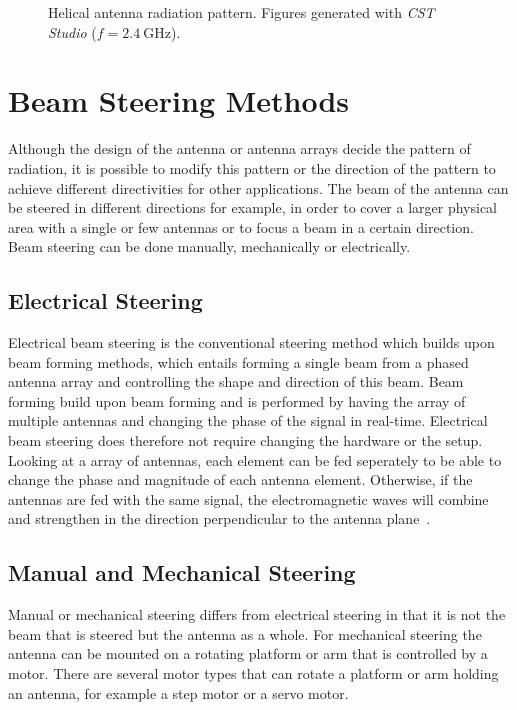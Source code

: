 \begin{figure}[H]
\begin{minipage}{0.45\textwidth}
    \end{minipage}
    \caption{Helical antenna radiation pattern. Figures generated with \textit{CST Studio} ($f=\SI{2.4}{\giga\hertz}$).}
    \label{fig:helical_1}
\end{figure}

\section{Beam Steering Methods}
Although the design of the antenna or antenna arrays decide the pattern of radiation, it is possible to modify this pattern or the direction of the pattern to achieve different directivities for other applications. The beam of the antenna can be steered in different directions for example, in order to cover a larger physical area with a single or few antennas or to focus a beam in a certain direction. Beam steering can be done manually, mechanically or electrically.

\subsection{Electrical Steering}
Electrical beam steering is the conventional steering method which builds upon beam forming methods, which entails forming a single beam from a phased antenna array and controlling the shape and direction of this beam. Beam forming build upon beam forming and is performed by having the array of multiple antennas and changing the phase of the signal in real-time. Electrical beam steering does therefore not require changing the hardware or the setup. Looking at a array of antennas, each element can be fed seperately to be able to change the phase and magnitude of each antenna element. Otherwise, if the antennas are fed with the same signal, the electromagnetic waves will combine and strengthen in the direction perpendicular to the antenna plane~\cite{beamsteering}.

\subsection{Manual and Mechanical Steering}
Manual or mechanical steering differs from electrical steering in that it is not the beam that is steered but the antenna as a whole. For mechanical steering the antenna can be mounted on a rotating platform or arm that is controlled by a motor. There are several motor types that can rotate a platform or arm holding an antenna, for example a step motor or a servo motor. 

